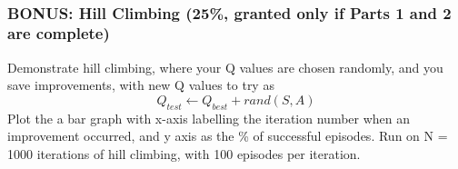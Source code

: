 \documentclass[11pt]{article}
\begin{document}
    \begin{center}
    \end{center}
    { \hspace*{\fill} \\}
    
    \subsubsection{BONUS: Hill Climbing (25\%, granted only if Parts 1 and 2
are
complete)}\label{bonus-hill-climbing-25-granted-only-if-parts-1-and-2-are-complete}

Demonstrate hill climbing, where your Q values are chosen randomly, and
you save improvements, with new Q values to try as
\[Q_{test}\leftarrow Q_{best}+rand(S,A)\] Plot the a bar graph with
x-axis labelling the iteration number when an improvement occurred, and
y axis as the \% of successful episodes. Run on N = 1000 iterations of
hill climbing, with 100 episodes per iteration.
\end{document}
